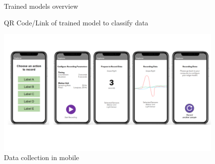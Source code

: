 \begin{figure}[!htb]
    \centering
    \caption{Trained models overview}
    \label{fig:models-overview}
\end{figure}

\begin{figure}[!htb]
    \centering
    \caption{QR Code/Link of trained model to classify data}
    \label{fig:model-link}
\end{figure}

\begin{figure}[!htb]
    \centering
    \includegraphics[width = \textwidth]{mockups/9.png}
    \caption{Data collection in mobile}
    \label{fig:mobile}
\end{figure}